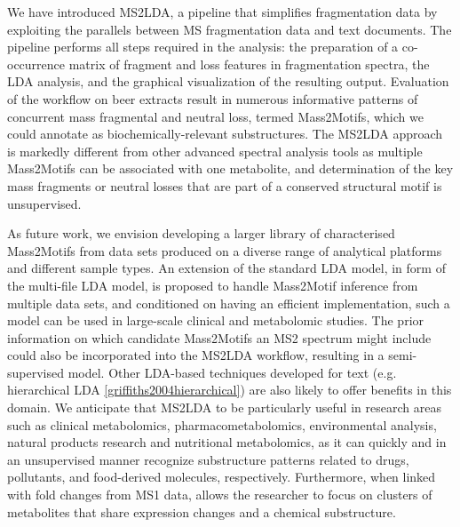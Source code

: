 We have introduced MS2LDA, a pipeline that simplifies fragmentation data by exploiting the parallels between MS fragmentation data and text documents. The pipeline performs all steps required in the analysis: the preparation of a co-occurrence matrix of fragment and loss features in fragmentation spectra, the LDA analysis, and the graphical visualization of the resulting output. Evaluation of the workflow on beer extracts result in numerous informative patterns of concurrent mass fragmental and neutral loss, termed Mass2Motifs, which we could annotate as biochemically-relevant substructures. The MS2LDA approach is markedly different from other advanced spectral analysis tools as multiple Mass2Motifs can be associated with one metabolite, and determination of the key mass fragments or neutral losses that are part of a conserved structural motif is unsupervised. 

As future work, we envision developing a larger library of characterised Mass2Motifs from data sets produced on a diverse range of analytical platforms and different sample types. An extension of the standard LDA model, in form of the multi-file LDA model, is proposed to handle Mass2Motif inference from multiple data sets, and conditioned on having an efficient implementation, such a model can be used in large-scale clinical and metabolomic studies. The prior information on which candidate Mass2Motifs an MS2 spectrum might include could also be incorporated into the MS2LDA workflow, resulting in a semi-supervised model. Other LDA-based techniques developed for text (e.g. hierarchical LDA \ref{griffiths2004hierarchical}) are also likely to offer benefits in this domain. We anticipate that MS2LDA to be particularly useful in research areas such as clinical metabolomics, pharmacometabolomics, environmental analysis, natural products research and nutritional metabolomics, as it can quickly and in an unsupervised manner recognize substructure patterns related to drugs, pollutants, and food-derived molecules, respectively. Furthermore, when linked with fold changes from MS1 data, allows the researcher to focus on clusters of metabolites that share expression changes and a chemical substructure.